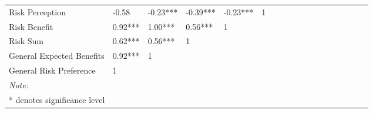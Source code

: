 \documentclass[
  donotrepeattitle,doc, 12pt, a4paper,floatsintext]{apa7}
\begin{document}
\begin{landscape}
\begin{table}
{\begin{tabular}[t]{llllllllllllllllll}
Risk Perception & -0.58 & -0.23*** & -0.39*** & -0.23*** & 1 &  &  &  &  &  &  &  &  &  &  &  & \\
Risk Benefit & 0.92*** & 1.00*** & 0.56*** & 1 &  &  &  &  &  &  &  &  &  &  &  &  & \\
Risk Sum & 0.62*** & 0.56*** & 1 &  &  &  &  &  &  &  &  &  &  &  &  &  & \\
\addlinespace
General Expected Benefits & 0.92*** & 1 &  &  &  &  &  &  &  &  &  &  &  &  &  &  & \\
General Risk Preference & 1 &  &  &  &  &  &  &  &  &  &  &  &  &  &  &  & \\
\bottomrule
\multicolumn{18}{l}{\rule{0pt}{1em}\textit{Note: }}\\
\multicolumn{18}{l}{\rule{0pt}{1em}* denotes significance level}\\
\end{tabular}}
\end{table}
\end{landscape}


\clearpage
\renewcommand{\listfigurename}{Figure captions}
\listoffigures
\clearpage
\renewcommand{\listtablename}{Table captions}
\end{document}
